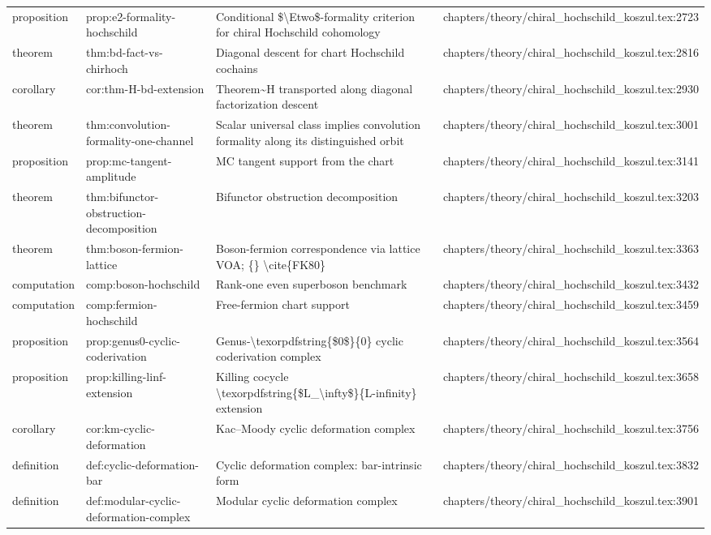 \documentclass[11pt]{article}
\begin{document}
\begin{longtable}{L{0.10\textwidth}L{0.26\textwidth}L{0.42\textwidth}L{0.22\textwidth}}
proposition & prop:e2-formality-hochschild & Cond{}itional \$\textbackslash{}Etwo\$-formality criterion for chiral Hochschild cohomology & chapters/theory/chiral\_hochschild\_koszul.tex:2723\\
theorem & thm:bd-fact-vs-chirhoch & Diagonal descent for chart Hochschild cochains & chapters/theory/chiral\_hochschild\_koszul.tex:2816\\
corollary & cor:thm-H-bd-extension & Theorem\textasciitilde{}H transported along diagonal factorization descent & chapters/theory/chiral\_hochschild\_koszul.tex:2930\\
theorem & thm:convolution-formality-one-channel & Scalar universal class implies convolution formality along its distinguished orbit & chapters/theory/chiral\_hochschild\_koszul.tex:3001\\
proposition & prop:mc-tangent-amplitude & MC tangent support from the chart & chapters/theory/chiral\_hochschild\_koszul.tex:3141\\
theorem & thm:bifunctor-obstruction-decomposition & Bifunctor obstruction decomposition & chapters/theory/chiral\_hochschild\_koszul.tex:3203\\
theorem & thm:boson-fermion-lattice & Boson-fermion correspondence via lattice VOA; \{\} \textbackslash{}cite\{FK80\} & chapters/theory/chiral\_hochschild\_koszul.tex:3363\\
computation & comp:boson-hochschild & Rank-one even superboson benchmark & chapters/theory/chiral\_hochschild\_koszul.tex:3432\\
computation & comp:fermion-hochschild & Free-fermion chart support & chapters/theory/chiral\_hochschild\_koszul.tex:3459\\
proposition & prop:genus0-cyclic-coderivation & Genus-\textbackslash{}texorpdfstring\{\$0\$\}\{0\} cyclic coderivation complex & chapters/theory/chiral\_hochschild\_koszul.tex:3564\\
proposition & prop:killing-linf-extension & Killing cocycle \textbackslash{}texorpdfstring\{\$L\_\textbackslash{}infty\$\}\{L-infinity\} extension & chapters/theory/chiral\_hochschild\_koszul.tex:3658\\
corollary & cor:km-cyclic-deformation & Kac--Moody cyclic deformation complex & chapters/theory/chiral\_hochschild\_koszul.tex:3756\\
definition & def:cyclic-deformation-bar & Cyclic deformation complex: bar-intrinsic form & chapters/theory/chiral\_hochschild\_koszul.tex:3832\\
definition & def:modular-cyclic-deformation-complex & Modular cyclic deformation complex & chapters/theory/chiral\_hochschild\_koszul.tex:3901\\

\end{longtable}
\end{document}
